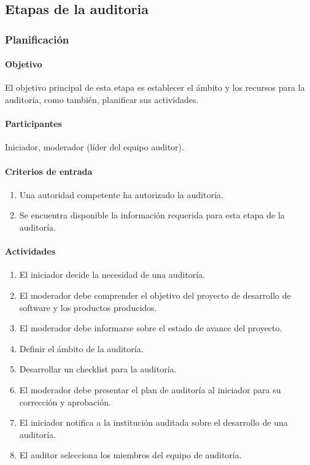 \subsection{Etapas de la auditoria}

\subsubsection{Planificación}

\paragraph{Objetivo\\}

El objetivo principal de esta etapa es establecer el ámbito y los recursos para la auditoría, como también, planificar sus actividades.

\paragraph{Participantes\\}

Iniciador, moderador (líder del equipo auditor).

\paragraph{Criterios de entrada}

\begin{enumerate}
	\item
		Una autoridad competente ha autorizado la auditoría.
	\item
		Se encuentra disponible la información requerida para esta etapa de la auditoría.
\end{enumerate}

\paragraph{Actividades}

\begin{enumerate}
	\item
		El iniciador decide la necesidad de una auditoría.
	\item
		El moderador debe comprender el objetivo del proyecto de desarrollo de software y los productos producidos.
	\item	
		El moderador debe informarse sobre el estado de avance del proyecto.
	\item
		Definir el ámbito de la auditoría.
	\item
		Desarrollar un checklist para la auditoría.
	\item
		El moderador debe presentar el plan de auditoría al iniciador para su corrección y aprobación. 
	\item
		El iniciador notifica a la institución auditada sobre el desarrollo de una auditoría.
	\item
		El auditor selecciona los miembros del equipo de auditoría.
\end{enumerate}

